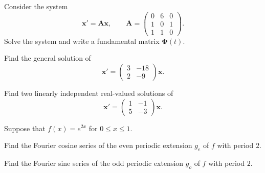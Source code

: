 \documentclass[11pt,oneside]{article}
\begin{document}
\begin{problem}
Consider the system
\[\mathbf x'=\mathbf A\mathbf x,\qquad\mathbf A=\begin{pmatrix}0&6&0\\1&0&1\\1&1&0\end{pmatrix}.\]
Solve the system and write a fundamental matrix $\boldsymbol\Phi(t)$.
\end{problem}

\begin{problem}
Find the general solution of
\[\mathbf x'=\begin{pmatrix}3&-18\\2&-9\end{pmatrix}\mathbf x.\]
\end{problem}

\begin{problem}
Find two linearly independent real-valued solutions of
\[\mathbf x'=\begin{pmatrix}1&-1\\5&-3\end{pmatrix}\mathbf x.\]
\end{problem}

\begin{problem}
Suppose that $f(x)=e^{2x}$ for $0\le x\le1$.
\begin{problemsubparts}
\item Find the Fourier cosine series of the even periodic extension $g_e$ of $f$ with period $2$.
\item Find the Fourier sine series of the odd periodic extension $g_o$ of $f$ with period $2$.
\end{problemsubparts}
\end{problem}
\end{document}
